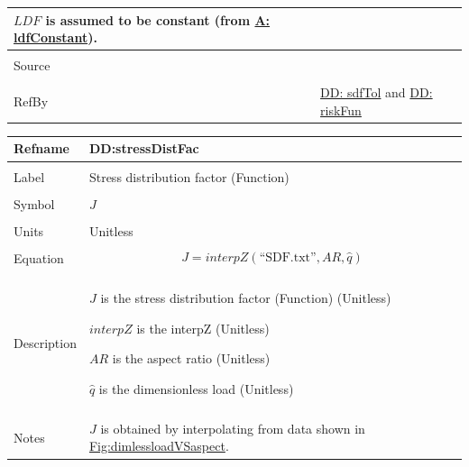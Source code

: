 \documentclass[12pt]{article}
\begin{document}
\begin{minipage}{\textwidth}
\begin{tabular}{>{\raggedright}p{}>{\raggedright\arraybackslash}p{}}
        $LDF$ is assumed to be constant (from \hyperref[assumpLDFC]{A: ldfConstant}).
        
\\ \midrule \\
Source & \cite{astm2009}
         
\\ \midrule \\
RefBy & \hyperref[DD:sdfTol]{DD: sdfTol} and \hyperref[DD:riskFun]{DD: riskFun}
        
\\ \bottomrule
\end{tabular}
\end{minipage}

\vspace{\baselineskip}
\noindent
\begin{minipage}{\textwidth}
\begin{tabular}{>{\raggedright}p{}>{\raggedright\arraybackslash}p{}}
\toprule \textbf{Refname} & \textbf{DD:stressDistFac}
\label{DD:stressDistFac}
\\ \midrule \\
Label & Stress distribution factor (Function)
        
\\ \midrule \\
Symbol & $J$
         
\\ \midrule \\
Units & Unitless
        
\\ \midrule \\
Equation & \begin{displaymath}
           J=interpZ\left(\text{``SDF.txt''},AR,\hat{q}\right)
           \end{displaymath}
\\ \midrule \\
Description & \begin{symbDescription}
              \item{$J$ is the stress distribution factor (Function) (Unitless)}
              \item{$interpZ$ is the interpZ (Unitless)}
              \item{$AR$ is the aspect ratio (Unitless)}
              \item{$\hat{q}$ is the dimensionless load (Unitless)}
              \end{symbDescription}
\\ \midrule \\
Notes & $J$ is obtained by interpolating from data shown in \hyperref[Figure:dimlessloadVSaspect]{Fig:dimlessloadVSaspect}.
        

\end{tabular}
\end{minipage}
\end{document}
